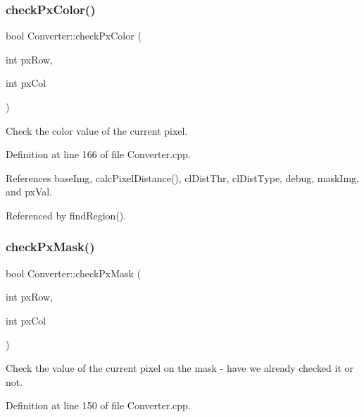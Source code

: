 \mbox{\label{class_converter_a29aedc9ca721def180a994abd6d299a4}} 
\subsubsection{\texorpdfstring{checkPxColor()}{checkPxColor()}}
{\footnotesize\ttfamily bool Converter\+::check\+Px\+Color (\begin{DoxyParamCaption}\item[{int}]{px\+Row,  }\item[{int}]{px\+Col }\end{DoxyParamCaption})\hspace{0.3cm}{\ttfamily [private]}}



Check the color value of the current pixel. 



Definition at line 166 of file Converter.\+cpp.



References base\+Img, calc\+Pixel\+Distance(), cl\+Dist\+Thr, cl\+Dist\+Type, debug, mask\+Img, and px\+Val.



Referenced by find\+Region().

\mbox{\label{class_converter_ab13b0858bbf310073492f77dc7be48b0}} 
\subsubsection{\texorpdfstring{checkPxMask()}{checkPxMask()}}
{\footnotesize\ttfamily bool Converter\+::check\+Px\+Mask (\begin{DoxyParamCaption}\item[{int}]{px\+Row,  }\item[{int}]{px\+Col }\end{DoxyParamCaption})\hspace{0.3cm}{\ttfamily [private]}}



Check the value of the current pixel on the mask -\/ have we already checked it or not. 



Definition at line 150 of file Converter.\+cpp.



